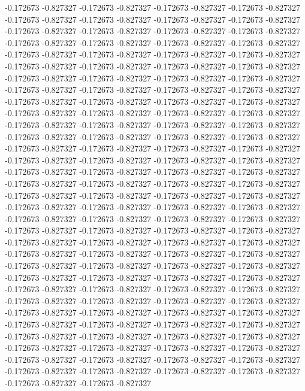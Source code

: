 -0.172673
-0.827327
-0.172673
-0.827327
-0.172673
-0.827327
-0.172673
-0.827327
-0.172673
-0.827327
-0.172673
-0.827327
-0.172673
-0.827327
-0.172673
-0.827327
-0.172673
-0.827327
-0.172673
-0.827327
-0.172673
-0.827327
-0.172673
-0.827327
-0.172673
-0.827327
-0.172673
-0.827327
-0.172673
-0.827327
-0.172673
-0.827327
-0.172673
-0.827327
-0.172673
-0.827327
-0.172673
-0.827327
-0.172673
-0.827327
-0.172673
-0.827327
-0.172673
-0.827327
-0.172673
-0.827327
-0.172673
-0.827327
-0.172673
-0.827327
-0.172673
-0.827327
-0.172673
-0.827327
-0.172673
-0.827327
-0.172673
-0.827327
-0.172673
-0.827327
-0.172673
-0.827327
-0.172673
-0.827327
-0.172673
-0.827327
-0.172673
-0.827327
-0.172673
-0.827327
-0.172673
-0.827327
-0.172673
-0.827327
-0.172673
-0.827327
-0.172673
-0.827327
-0.172673
-0.827327
-0.172673
-0.827327
-0.172673
-0.827327
-0.172673
-0.827327
-0.172673
-0.827327
-0.172673
-0.827327
-0.172673
-0.827327
-0.172673
-0.827327
-0.172673
-0.827327
-0.172673
-0.827327
-0.172673
-0.827327
-0.172673
-0.827327
-0.172673
-0.827327
-0.172673
-0.827327
-0.172673
-0.827327
-0.172673
-0.827327
-0.172673
-0.827327
-0.172673
-0.827327
-0.172673
-0.827327
-0.172673
-0.827327
-0.172673
-0.827327
-0.172673
-0.827327
-0.172673
-0.827327
-0.172673
-0.827327
-0.172673
-0.827327
-0.172673
-0.827327
-0.172673
-0.827327
-0.172673
-0.827327
-0.172673
-0.827327
-0.172673
-0.827327
-0.172673
-0.827327
-0.172673
-0.827327
-0.172673
-0.827327
-0.172673
-0.827327
-0.172673
-0.827327
-0.172673
-0.827327
-0.172673
-0.827327
-0.172673
-0.827327
-0.172673
-0.827327
-0.172673
-0.827327
-0.172673
-0.827327
-0.172673
-0.827327
-0.172673
-0.827327
-0.172673
-0.827327
-0.172673
-0.827327
-0.172673
-0.827327
-0.172673
-0.827327
-0.172673
-0.827327
-0.172673
-0.827327
-0.172673
-0.827327
-0.172673
-0.827327
-0.172673
-0.827327
-0.172673
-0.827327
-0.172673
-0.827327
-0.172673
-0.827327
-0.172673
-0.827327
-0.172673
-0.827327
-0.172673
-0.827327
-0.172673
-0.827327
-0.172673
-0.827327
-0.172673
-0.827327
-0.172673
-0.827327
-0.172673
-0.827327
-0.172673
-0.827327
-0.172673
-0.827327
-0.172673
-0.827327
-0.172673
-0.827327
-0.172673
-0.827327
-0.172673
-0.827327
-0.172673
-0.827327
-0.172673
-0.827327
-0.172673
-0.827327
-0.172673
-0.827327
-0.172673
-0.827327
-0.172673
-0.827327
-0.172673
-0.827327
-0.172673
-0.827327
-0.172673
-0.827327
-0.172673
-0.827327
-0.172673
-0.827327
-0.172673
-0.827327
-0.172673
-0.827327
-0.172673
-0.827327
-0.172673
-0.827327
-0.172673
-0.827327
-0.172673
-0.827327
-0.172673
-0.827327
-0.172673
-0.827327
-0.172673
-0.827327
-0.172673
-0.827327
-0.172673
-0.827327
